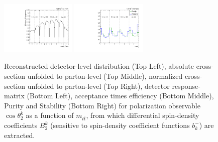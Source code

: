 \begin{figure}[htb]
\begin{center}
 \includegraphics[width=0.32\textwidth]{fig_fullRun2UL/unfolding/combined/TotEff_b2k_mttbar.pdf}
 \includegraphics[width=0.32\textwidth]{fig_fullRun2UL/unfolding/combined/PurStab_b2k_mttbar.pdf} \\
\caption{Reconstructed detector-level distribution (Top Left), absolute cross-section unfolded to parton-level (Top Middle), normalized cross-section unfolded to parton-level (Top Right), detector response-matrix (Bottom Left), acceptance times efficiency (Bottom Middle), Purity and Stability (Bottom Right) for polarization observable $\cos\theta_{2}^{k}$ as a function of $m_{t\bar{t}}$, from which differential spin-density coefficients $B_{2}^{k}$ (sensitive to spin-density coefficient functions $b_k^{-}$) are extracted.}
\label{fig:b2k_mttbar}
\end{center}
\end{figure}
\clearpage
